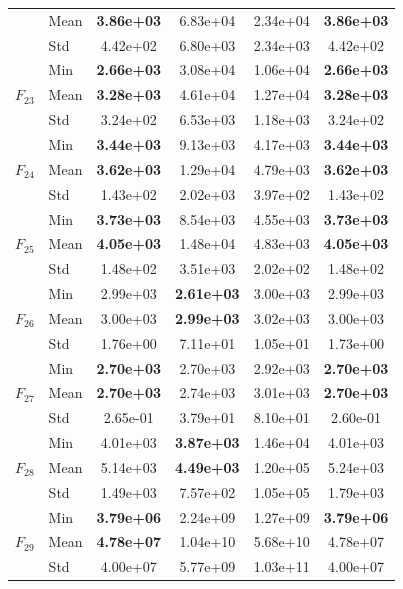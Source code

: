 \begin{center}
\begin{longtable}{clcccc}
 & Mean & \textbf{3.86e+03} & 6.83e+04 & 2.34e+04 & \textbf{3.86e+03} \\
 & Std & 4.42e+02 & 6.80e+03 & 2.34e+03 & 4.42e+02 \\
\midrule
\multirow{3}{*}{$F_{23}$} & Min & \textbf{2.66e+03} & 3.08e+04 & 1.06e+04 & \textbf{2.66e+03} \\
 & Mean & \textbf{3.28e+03} & 4.61e+04 & 1.27e+04 & \textbf{3.28e+03} \\
 & Std & 3.24e+02 & 6.53e+03 & 1.18e+03 & 3.24e+02 \\
\midrule
\multirow{3}{*}{$F_{24}$} & Min & \textbf{3.44e+03} & 9.13e+03 & 4.17e+03 & \textbf{3.44e+03} \\
 & Mean & \textbf{3.62e+03} & 1.29e+04 & 4.79e+03 & \textbf{3.62e+03} \\
 & Std & 1.43e+02 & 2.02e+03 & 3.97e+02 & 1.43e+02 \\
\midrule
\multirow{3}{*}{$F_{25}$} & Min & \textbf{3.73e+03} & 8.54e+03 & 4.55e+03 & \textbf{3.73e+03} \\
 & Mean & \textbf{4.05e+03} & 1.48e+04 & 4.83e+03 & \textbf{4.05e+03} \\
 & Std & 1.48e+02 & 3.51e+03 & 2.02e+02 & 1.48e+02 \\
\midrule
\multirow{3}{*}{$F_{26}$} & Min & 2.99e+03 & \textbf{2.61e+03} & 3.00e+03 & 2.99e+03 \\
 & Mean & 3.00e+03 & \textbf{2.99e+03} & 3.02e+03 & 3.00e+03 \\
 & Std & 1.76e+00 & 7.11e+01 & 1.05e+01 & 1.73e+00 \\
\midrule
\multirow{3}{*}{$F_{27}$} & Min & \textbf{2.70e+03} & 2.70e+03 & 2.92e+03 & \textbf{2.70e+03} \\
 & Mean & \textbf{2.70e+03} & 2.74e+03 & 3.01e+03 & \textbf{2.70e+03} \\
 & Std & 2.65e-01 & 3.79e+01 & 8.10e+01 & 2.60e-01 \\
\midrule
\multirow{3}{*}{$F_{28}$} & Min & 4.01e+03 & \textbf{3.87e+03} & 1.46e+04 & 4.01e+03 \\
 & Mean & 5.14e+03 & \textbf{4.49e+03} & 1.20e+05 & 5.24e+03 \\
 & Std & 1.49e+03 & 7.57e+02 & 1.05e+05 & 1.79e+03 \\
\midrule
\multirow{3}{*}{$F_{29}$} & Min & \textbf{3.79e+06} & 2.24e+09 & 1.27e+09 & \textbf{3.79e+06} \\
 & Mean & \textbf{4.78e+07} & 1.04e+10 & 5.68e+10 & 4.78e+07 \\
 & Std & 4.00e+07 & 5.77e+09 & 1.03e+11 & 4.00e+07 \\
\bottomrule
\end{longtable}
\end{center}